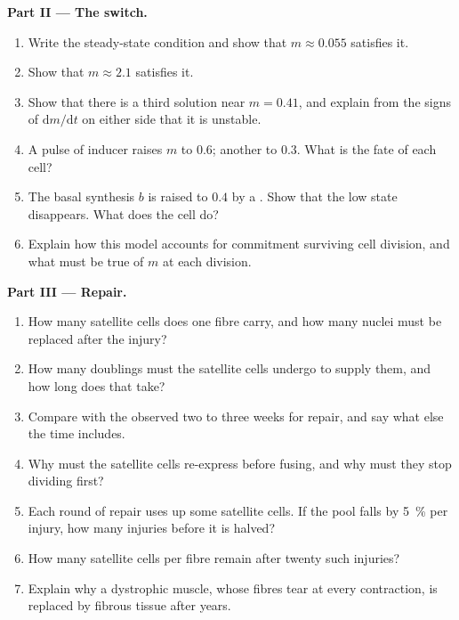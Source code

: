 \begin{problem}
\medskip
\noindent\textbf{Part II --- The switch.}
\begin{enumerate}[resume]
  \item Write the steady-state condition and show that $m \approx
        0.055$ satisfies it.
  \item Show that $m \approx 2.1$ satisfies it.
  \item Show that there is a third solution near $m = 0.41$, and
        explain from the signs of $\mathrm{d}m/\mathrm{d}t$ on either
        side that it is unstable.
  \item A pulse of inducer raises $m$ to $0.6$; another to $0.3$.
        What is the fate of each cell?
  \item The basal synthesis $b$ is raised to $0.4$ by a .
        Show that the low state disappears. What does the cell do?
  \item Explain how this model accounts for commitment surviving
        cell division, and what must be true of $m$ at each division.
\end{enumerate}

\medskip
\noindent\textbf{Part III --- Repair.}
\begin{enumerate}[resume]
  \item How many satellite cells does one fibre carry, and how many
        nuclei must be replaced after the injury?
  \item How many doublings must the satellite cells undergo to
        supply them, and how long does that take?
  \item Compare with the observed two to three weeks for repair, and
        say what else the time includes.
  \item Why must the satellite cells re-express  before fusing,
        and why must they stop dividing first?
  \item Each round of repair uses up some satellite cells. If the
        pool falls by \qty{5}{\%} per injury, how many injuries
        before it is halved?
  \item How many satellite cells per fibre remain after twenty such
        injuries?
  \item Explain why a dystrophic muscle, whose fibres tear at every
        contraction, is replaced by fibrous tissue after years.
\end{enumerate}


\end{problem}
